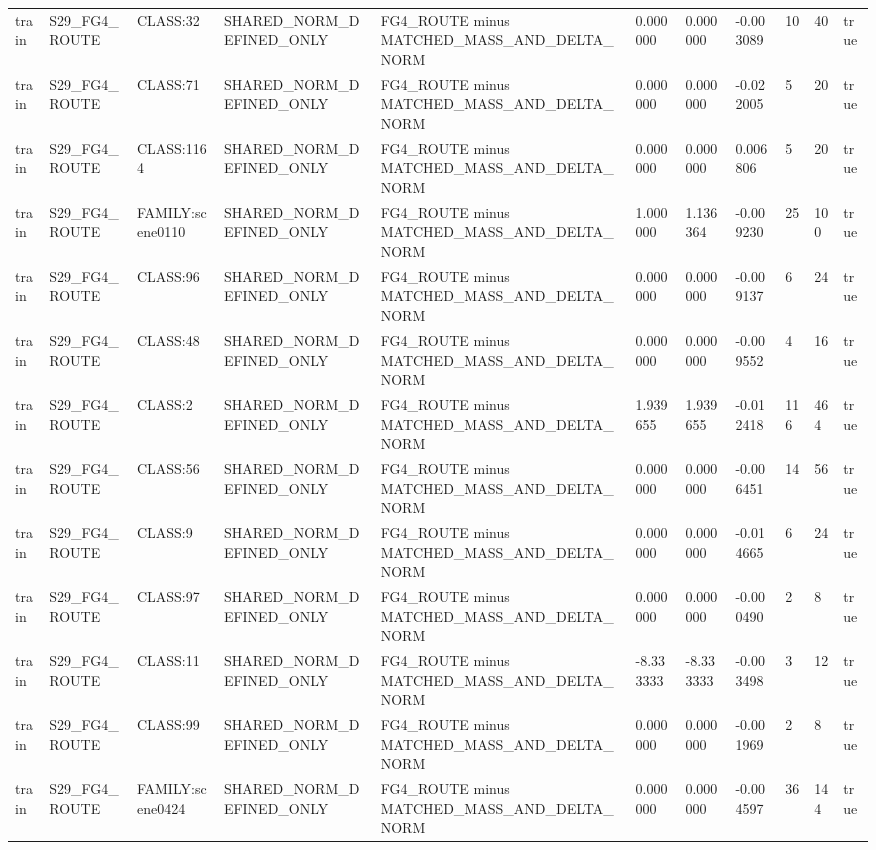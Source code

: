 \begin{tabular}{lllllllllll}
train & S29\_FG4\_ROUTE & CLASS:32 & SHARED\_NORM\_DEFINED\_ONLY & FG4\_ROUTE minus MATCHED\_MASS\_AND\_DELTA\_NORM & 0.000000 & 0.000000 & -0.003089 & 10 & 40 & true \\
train & S29\_FG4\_ROUTE & CLASS:71 & SHARED\_NORM\_DEFINED\_ONLY & FG4\_ROUTE minus MATCHED\_MASS\_AND\_DELTA\_NORM & 0.000000 & 0.000000 & -0.022005 & 5 & 20 & true \\
train & S29\_FG4\_ROUTE & CLASS:1164 & SHARED\_NORM\_DEFINED\_ONLY & FG4\_ROUTE minus MATCHED\_MASS\_AND\_DELTA\_NORM & 0.000000 & 0.000000 & 0.006806 & 5 & 20 & true \\
train & S29\_FG4\_ROUTE & FAMILY:scene0110 & SHARED\_NORM\_DEFINED\_ONLY & FG4\_ROUTE minus MATCHED\_MASS\_AND\_DELTA\_NORM & 1.000000 & 1.136364 & -0.009230 & 25 & 100 & true \\
train & S29\_FG4\_ROUTE & CLASS:96 & SHARED\_NORM\_DEFINED\_ONLY & FG4\_ROUTE minus MATCHED\_MASS\_AND\_DELTA\_NORM & 0.000000 & 0.000000 & -0.009137 & 6 & 24 & true \\
train & S29\_FG4\_ROUTE & CLASS:48 & SHARED\_NORM\_DEFINED\_ONLY & FG4\_ROUTE minus MATCHED\_MASS\_AND\_DELTA\_NORM & 0.000000 & 0.000000 & -0.009552 & 4 & 16 & true \\
train & S29\_FG4\_ROUTE & CLASS:2 & SHARED\_NORM\_DEFINED\_ONLY & FG4\_ROUTE minus MATCHED\_MASS\_AND\_DELTA\_NORM & 1.939655 & 1.939655 & -0.012418 & 116 & 464 & true \\
train & S29\_FG4\_ROUTE & CLASS:56 & SHARED\_NORM\_DEFINED\_ONLY & FG4\_ROUTE minus MATCHED\_MASS\_AND\_DELTA\_NORM & 0.000000 & 0.000000 & -0.006451 & 14 & 56 & true \\
train & S29\_FG4\_ROUTE & CLASS:9 & SHARED\_NORM\_DEFINED\_ONLY & FG4\_ROUTE minus MATCHED\_MASS\_AND\_DELTA\_NORM & 0.000000 & 0.000000 & -0.014665 & 6 & 24 & true \\
train & S29\_FG4\_ROUTE & CLASS:97 & SHARED\_NORM\_DEFINED\_ONLY & FG4\_ROUTE minus MATCHED\_MASS\_AND\_DELTA\_NORM & 0.000000 & 0.000000 & -0.000490 & 2 & 8 & true \\
train & S29\_FG4\_ROUTE & CLASS:11 & SHARED\_NORM\_DEFINED\_ONLY & FG4\_ROUTE minus MATCHED\_MASS\_AND\_DELTA\_NORM & -8.333333 & -8.333333 & -0.003498 & 3 & 12 & true \\
train & S29\_FG4\_ROUTE & CLASS:99 & SHARED\_NORM\_DEFINED\_ONLY & FG4\_ROUTE minus MATCHED\_MASS\_AND\_DELTA\_NORM & 0.000000 & 0.000000 & -0.001969 & 2 & 8 & true \\
train & S29\_FG4\_ROUTE & FAMILY:scene0424 & SHARED\_NORM\_DEFINED\_ONLY & FG4\_ROUTE minus MATCHED\_MASS\_AND\_DELTA\_NORM & 0.000000 & 0.000000 & -0.004597 & 36 & 144 & true \\

\end{tabular}
